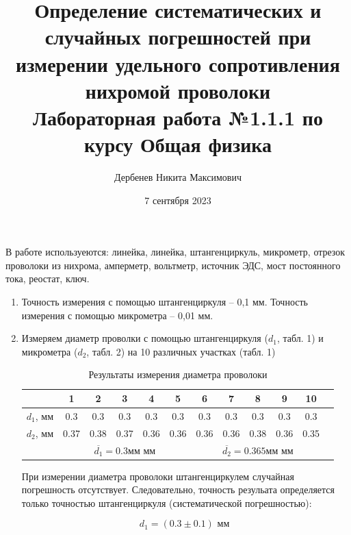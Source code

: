 \documentclass[a4paper, 10pt]{article}%
\author{Дербенев Никита Максимович}
\title{Определение систематических и случайных погрешностей при измерении удельного сопротивления нихромой проволоки \\
Лабораторная работа №1.1.1 по курсу Общая физика}
\date{7 сентября 2023}
\begin{document}
\maketitle 
\newpage
В работе используеются: линейка, линейка, штангенциркуль, микрометр, отрезок проволоки из нихрома, амперметр, вольтметр, источник ЭДС, мост постоянного тока, реостат, ключ. 
\begin{enumerate}
\item Точность измерения с помощью штангенциркуля -- 0,1 мм. Точность измерения с помощью микрометра -- 0,01 мм.
\item Измеряем диаметр проволки с помощью штангенциркуля ($d_1$, табл. 1) и микрометра ($d_2$, табл. 2) на 10 различных участках (табл. 1) \\
\begin{table}[h]
\caption{Результаты измерения диаметра проволоки}
\centering
\begin{tabular}{|r|c|c|c|c|c|c|c|c|c|c|c|}
\hline
& 1 & 2 & 3 & 4 & 5 & 6 & 7 & 8 & 9 & 10\\
\hline
$d_1$, мм & 0.3 & 0.3 & 0.3 & 0.3 & 0.3 & 0.3 & 0.3 & 0.3 & 0.3 & 0.3 \\
\hline
$d_2$, мм & 0.37 & 0.38 & 0.37 & 0.36 & 0.36 & 0.36 & 0.36 & 0.38 & 0.36 & 0.35 \\
\hline
\multicolumn{1}{|r|}{} & \multicolumn{5}{c}{ \( \overline{d_{1}} = 0.3 мм \) мм}  & \multicolumn{5}{c|}{ \( \overline{d_{2}} = 0.365 мм \) мм}\\
\hline
\end{tabular}
\end{table}

При измерении диаметра проволоки штангенциркулем случайная погрешность отсутствует. Следовательно, точность резульата определяется только точностью штангенциркуля (систематической погрешностью):
\begin{center}
\[ d_1 = (0.3 \pm 0.1) \text{ мм } \]
\end{center}


\end{enumerate}
\end{document}
